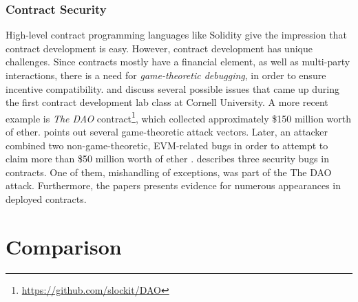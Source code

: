 {\subsubsection{Contract Security}

High-level contract programming languages like Solidity give the impression that contract development is easy. However, contract development has unique challenges. Since contracts mostly have a financial element, as well as multi-party interactions, there is a need for \emph{game-theoretic debugging}, in order to ensure incentive compatibility. \cite{delmolino2015programmer} and \cite{delmolino2015step} discuss several possible issues that came up during the first contract development lab class at Cornell University. A more recent example is \emph{The DAO} contract\footnote{\url{https://github.com/slockit/DAO}}, which collected approximately \$150 million worth of ether. \cite{mark2016} points out several game-theoretic attack vectors. Later, an attacker combined two non-game-theoretic, \ac{EVM}-related bugs in order to attempt to claim more than \$50 million worth of ether \parencite{daian2016dao}. \cite{cryptoeprint:2016:633} describes three security bugs in contracts. One of them, mishandling of exceptions, was part of the The DAO attack. Furthermore, the papers presents evidence for numerous appearances in deployed contracts.


\section{Comparison}

}
